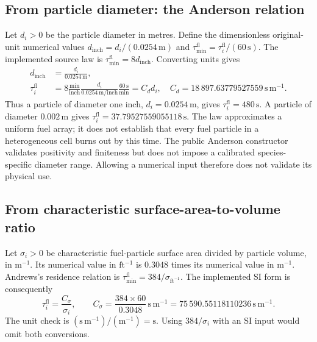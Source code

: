\documentclass[11pt,a4paper]{article}
\begin{document}
\subsection{From particle diameter: the Anderson relation}

Let $d_i>0$ be the particle diameter in metres. Define the dimensionless
original-unit numerical values $d_{\mathrm{inch}}=d_i/(0.0254\,\mathrm m)$
and $\tau_{\mathrm{min}}^{\mathrm{fl}}=\tau_i^{\mathrm{fl}}/(60\,\mathrm s)$.
The implemented source law is
$\tau_{\mathrm{min}}^{\mathrm{fl}}=8d_{\mathrm{inch}}$. Converting units gives
\begin{align}
 d_{\mathrm{inch}}&=\frac{d_i}{0.0254\,\mathrm{m}},\\
 \tau_i^{\mathrm{fl}}&=8\frac{\mathrm{min}}{\mathrm{inch}}
       \frac{d_i}{0.0254\,\mathrm{m}/\mathrm{inch}}
       \frac{60\,\mathrm{s}}{\mathrm{min}}
      =C_d d_i,
 \quad
 C_d=18\,897.63779527559\,\mathrm{s\,m^{-1}}.
 \label{eq:residence-diameter}
\end{align}
Thus a particle of diameter one inch, $d_i=0.0254\,\mathrm{m}$, gives
$\tau_i^{\mathrm{fl}}=480\,\mathrm{s}$. A particle of diameter $0.002\,\mathrm{m}$ gives
$\tau_i^{\mathrm{fl}}=37.79527559055118\,\mathrm{s}$. The law approximates a uniform fuel array;
it does not establish that every fuel particle in a heterogeneous cell burns
out by this time. The public Anderson constructor validates positivity and
finiteness but does not impose a calibrated species-specific diameter range.
Allowing a numerical input therefore does not validate its physical use.

\subsection{From characteristic surface-area-to-volume ratio}

Let $\sigma_i>0$ be characteristic fuel-particle surface area divided by
particle volume, in $\mathrm{m^{-1}}$. Its numerical value in
$\mathrm{ft^{-1}}$ is $0.3048$ times its numerical value in
$\mathrm{m^{-1}}$. Andrews's residence relation is
$\tau_{\mathrm{min}}^{\mathrm{fl}}=384/\sigma_{\mathrm{ft^{-1}}}$.\cite{andrews2018}
The implemented SI form is consequently
\begin{equation}
 \tau_i^{\mathrm{fl}}=\frac{C_\sigma}{\sigma_i},\qquad
 C_\sigma=\frac{384\times60}{0.3048}
          \,\mathrm{s\,m^{-1}}
 =75\,590.55118110236\,\mathrm{s\,m^{-1}}.
 \label{eq:residence-sav}
\end{equation}
The unit check is
$(\mathrm{s\,m^{-1}})/(\mathrm{m^{-1}})=\mathrm{s}$.
Using $384/\sigma_i$ with an SI input would omit both conversions.
\end{document}
